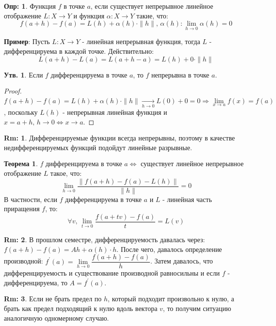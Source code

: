 \documentclass[12pt]{article}
\theoremstyle{definition}
\newtheorem{defn}{Опр:}
\newtheorem{rem}{Rm:}
\newtheorem{prop}{Утв.}
\newtheorem{theorem}{Теорема}
\begin{document}
\begin{defn}
	Функция $f$  в точке $a$, если существует непрерывное линейное отображение $L\colon X \to Y$ и функция $\alpha \colon X \to Y$ такие, что:
	$$
		f(a + h) - f(a) = L(h) + \alpha(h){\cdot}\|h\|, \, \alpha(h) \colon \lim\limits_{h \to 0}{\alpha(h)} = 0
	$$ 
\end{defn}
\textbf{Пример}: Пусть $L \colon X \to Y$ - линейная непрерывная функция, тогда $L$ - дифференцируема в каждой точке. Действительно:
$$
	L(a+h) - L(a) = L(a + h - a) =  L(h) + 0{\cdot}\|h\|
$$
\begin{prop}
	Если $f$ дифференцируема в точке $a$, то $f$ непрерывна в точке $a$.
\end{prop}
\begin{proof}
	$f(a+h) - f(a) = L(h)  + \alpha(h){\cdot}\|h\| \xrightarrow[h\to 0]{} L(0) + 0 = 0 \Rightarrow \lim\limits_{x \to a}f(x) = f(a)$, поскольку $L(h)$ - непрерывная линейная функция и $x = a + h,\, h \to 0 \Leftrightarrow x \to a$.
\end{proof}
\begin{rem}
	Дифференцируемые функции всегда непрерывны, поэтому в качестве недифференцируемых функций подойдут линейные разрывные.
\end{rem}
\begin{theorem}
	$f$ дифференцируема в точке $a \Leftrightarrow$ существует линейное непрерывное отображение $L$ такое, что:
	$$
		\lim\limits_{h \to 0} \dfrac{\|f(a+h) - f(a) - L(h)\|}{\|h\|} = 0
	$$
	В частности, если $f$ дифференцируема в точке $a$ и $L$ - линейная часть приращения $f$, то: 
	$$
		\forall v, \, \lim\limits_{t \to 0} \dfrac{f(a + tv) - f(a)}{t} = L(v)
	$$
\end{theorem}
\begin{rem}
	В прошлом семестре, дифференцируемость давалась через: $f(a+h) - f(a) = Ah + \alpha(h){\cdot}h$. После чего, давалось определение производной: $f^\prime(a) = \lim\limits_{h \to 0}\dfrac{f(a+h) - f(a)}{h}$. Затем давалось, что дифференцируемость и существование производной равносильны и если $f$ - дифференцируема, то $A = f^\prime(a)$.
\end{rem}
\begin{rem}
	Если не брать предел по $h$, который подходит произвольно к нулю, а брать как предел подходящий к нулю вдоль вектора $v$, то получим ситуацию аналогичную одномерному случаю.
\end{rem}
\end{document}
